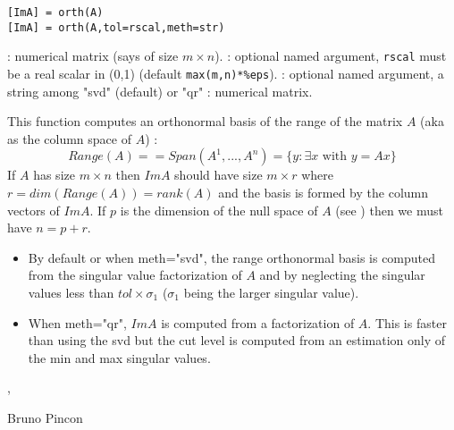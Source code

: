 
\begin{mandesc}
\end{mandesc}

\begin{calling_sequence}
\begin{verbatim}
[ImA] = orth(A) 
[ImA] = orth(A,tol=rscal,meth=str) 
\end{verbatim}
\end{calling_sequence}
\begin{parameters}
  \begin{varlist}
     :  numerical matrix (says of size $m \times n$).
     : optional named argument, \verb+rscal+ must be  a real scalar in (0,1) (default \verb+max(m,n)*%eps+).
     : optional named argument, a string among "svd" (default) or "qr"
     : numerical matrix.
  \end{varlist}
\end{parameters}

\begin{mandescription}
This function computes an orthonormal basis of the range of the
matrix $A$ (aka as the column space of $A$) :
$$
    Range(A) = = Span(A^1,...,A^n) = \{ y : \exists x \mbox{ with } y = Ax \}  
$$
 If $A$ has size $m \times n$ then $ImA$ should have 
size $m \times r$ where $r = dim(Range(A)) = rank(A)$
and the basis is formed by the column vectors of $ImA$. 
 If $p$ is the dimension of the null space of $A$ (see )
then we must have $n = p + r$.
\begin{itemize}
\item By default or when  meth="svd", the range orthonormal basis 
is computed from the singular value factorization of $A$ and by 
neglecting the singular values less than $tol \times \sigma_1$
($\sigma_1$ being the larger singular value). 
\item When  meth="qr", $ImA$ is computed from a  
factorization of $A$. This is faster than using the svd but 
the cut level is computed from an estimation only of the min 
and max singular values.
\end{itemize}
\end{mandescription}

\begin{examples}
  \begin{program}  
\end{program}
\end{examples}

\begin{manseealso}
   ,   
\end{manseealso}

\begin{authors}
   Bruno Pincon
\end{authors}
